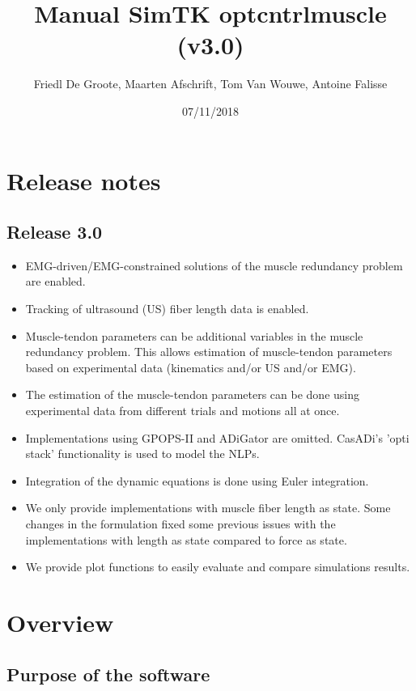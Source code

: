 \documentclass[a4paper,oneside,11pt]{article}
\begin{document}
\title{Manual SimTK optcntrlmuscle (v3.0)}
\author{Friedl De Groote, Maarten Afschrift, Tom Van Wouwe, Antoine Falisse}
\date{07/11/2018} 
\maketitle
\tableofcontents

\section{Release notes}

\subsection{Release 3.0}
\begin{itemize}
	\item EMG-driven/EMG-constrained solutions of the muscle redundancy problem are enabled.
	\item Tracking of ultrasound (US) fiber length data is enabled.
	\item Muscle-tendon parameters can be additional variables in the muscle redundancy problem. This allows estimation of muscle-tendon parameters based on experimental data (kinematics and/or US and/or EMG).
	\item The estimation of the muscle-tendon parameters can be done using experimental data from different trials and motions all at once.
	\item Implementations using GPOPS-II and ADiGator are omitted. CasADi's 'opti stack' functionality is used to model the NLPs.
	\item Integration of the dynamic equations is done using Euler integration.
	\item We only provide implementations with muscle fiber length as state. Some changes in the formulation fixed some previous issues with the implementations with length as state compared to force as state.
	\item We provide plot functions to easily evaluate and compare simulations results.

	 
\end{itemize}


\section{Overview}
\label{Overview}

\subsection{Purpose of the software}
\end{document}
